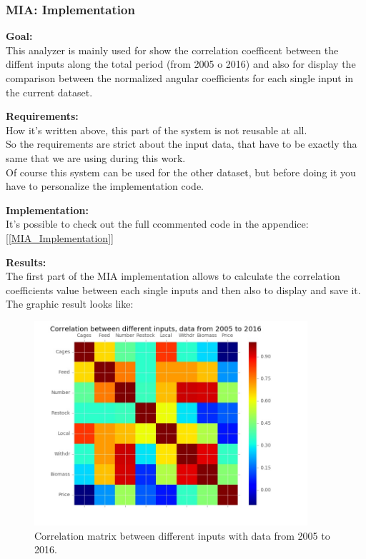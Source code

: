 \newpage

\subsubsection{MIA: Implementation}
\textbf{Goal:}\\
This analyzer is mainly used for show the correlation coefficent between the diffent inputs along the total period (from 2005 o 2016) and also for display the comparison between the normalized angular coefficients for each single input in the current dataset.

\textbf{Requirements:}\\
How it's written above, this part of the system is not reusable at all.\\
So the requirements are strict about the input data, that have to be exactly tha same that we are using during this work.\\
Of course this system can be used for the other dataset, but before doing it you have to personalize the implementation code.

\textbf{Implementation:}\\
It's possible to check out the full ccommented code in the appendice: [\ref{MIA_Implementation}]

\textbf{Results:} \\
The first part of the MIA implementation allows to calculate the correlation coefficients value between each single inputs and then also to display and save it. The graphic result looks like:

\begin{figure}[H]
	\centering
    \includegraphics[width=0.90\textwidth]{Files/Total_Dataset_Years_Matrix.jpg}
    \caption{Correlation matrix between different inputs with data from 2005 to 2016.}
\end{figure}

